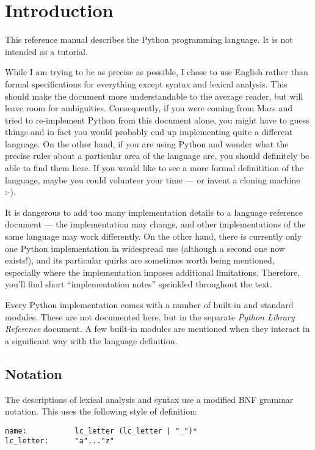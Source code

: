 \chapter{Introduction}

This reference manual describes the Python programming language.
It is not intended as a tutorial.

While I am trying to be as precise as possible, I chose to use English
rather than formal specifications for everything except syntax and
lexical analysis.  This should make the document more understandable
to the average reader, but will leave room for ambiguities.
Consequently, if you were coming from Mars and tried to re-implement
Python from this document alone, you might have to guess things and in
fact you would probably end up implementing quite a different language.
On the other hand, if you are using
Python and wonder what the precise rules about a particular area of
the language are, you should definitely be able to find them here.
If you would like to see a more formal definitition of the language,
maybe you could volunteer your time --- or invent a cloning machine
:-).

It is dangerous to add too many implementation details to a language
reference document --- the implementation may change, and other
implementations of the same language may work differently.  On the
other hand, there is currently only one Python implementation in
widespread use (although a second one now exists!), and
its particular quirks are sometimes worth being mentioned, especially
where the implementation imposes additional limitations.  Therefore,
you'll find short ``implementation notes'' sprinkled throughout the
text.

Every Python implementation comes with a number of built-in and
standard modules.  These are not documented here, but in the separate
{\em Python Library Reference} document.  A few built-in modules are
mentioned when they interact in a significant way with the language
definition.

\section{Notation}

The descriptions of lexical analysis and syntax use a modified BNF
grammar notation.  This uses the following style of definition:

\begin{verbatim}
name:           lc_letter (lc_letter | "_")*
lc_letter:      "a"..."z"
\end{verbatim}


